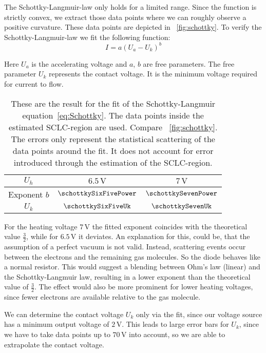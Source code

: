 \documentclass[a4paper,10pt,twocolumn]{article}
\newcommand{\volt}{\, \mathrm{V}}
\newcommand{\sixfiveV}{6.5 \volt}
\newcommand{\sevenV}{7 \volt}
\newcommand{\minvoltage}{2 \volt}
\begin{document}
    The Schottky-Langmuir-law only holds for a limited range.
    Since the function is strictly convex, we extract those data points where we can roughly observe a 
    positive curvature.
    These data points are depicted in ~\autoref{fig:schottky}.
    To verify the Schottky-Langmuir-law we fit the following function:
    \begin{equation}
        \label{eq:Schottky}
        I = a (U_a - U_k)^{b}
    \end{equation}
    
    Here $U_a$ is the accelerating voltage and $a$, $b$ are free parameters.
    The free parameter $U_k$ represents the contact voltage.
    It is the minimum voltage required for current to flow.
    
    \begin{table}[h!]
        \centering
        \begin{tabular}{c | c c}
            $U_h$ & $\sixfiveV$ & $\sevenV$ \\
            \hline 
            Exponent $b$ & $\schottkySixFivePower$ & $\schottkySevenPower$ \\
            $U_k$ & $\schottkySixFiveUk$ & $\schottkySevenUk$
        \end{tabular}
        \caption{These are the result for the fit of the Schottky-Langmuir equation~\eqref{eq:Schottky}.
        The data points inside the estimated SCLC-region are used.
        Compare ~\autoref{fig:schottky}.
        The errors only represent the statistical scattering of the data points around the fit.
        It does not account for error introduced through the estimation of the SCLC-region.}
        \label{tab:schottkyFit}
    \end{table}
    
    For the heating voltage $\sevenV$ the fitted exponent coincides with the theoretical value $\frac{3}{2}$, while
    for $\sixfiveV$ it deviates.
    An explanation for this, could be, that the assumption of a perfect vacuum is not valid.
    Instead, scattering events occur between the electrons and the remaining gas molecules.
    So the diode behaves like a normal resistor.
    This would suggest a blending between Ohm's law (linear) and the Schottky-Langmuir law, resulting in a lower
    exponent than the theoretical value of $\frac{3}{2}$.
    The effect would also be more prominent for lower heating voltages, since fewer electrons are available relative to
    the gas molecule.
    
    We can determine the contact voltage $U_k$ only via the fit, since our voltage source has a minimum output voltage of $\minvoltage$.
    This leads to large error bars for $U_k$, since we have to take data points up to $70 \volt$ into account,
    so we are able to extrapolate the contact voltage.
    
\end{document}
